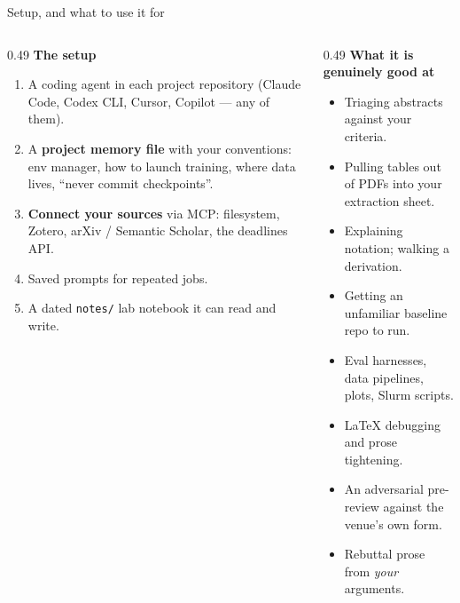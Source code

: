 \documentclass[aspectratio=169,11pt]{beamer}
\newcommand{\code}[1]{\texttt{\small #1}}
\newcommand{\key}[1]{\textbf{\color{brand}#1}}
\begin{document}
\begin{frame}{Setup, and what to use it for}
\begin{columns}[T]
\begin{column}{0.49\textwidth}
\textbf{The setup}
\footnotesize
\begin{enumerate}
  \item A coding agent in each project repository (Claude Code, Codex CLI,
        Cursor, Copilot --- any of them).
  \item A \key{project memory file} with your conventions: env manager, how to
        launch training, where data lives, ``never commit checkpoints''.
  \item \key{Connect your sources} via MCP: filesystem, Zotero, arXiv /
        Semantic Scholar, the deadlines API.
  \item Saved prompts for repeated jobs.
  \item A dated \code{notes/} lab notebook it can read and write.
\end{enumerate}
\end{column}
\begin{column}{0.49\textwidth}
\textbf{What it is genuinely good at}
\footnotesize
\begin{itemize}
  \item Triaging abstracts against your criteria.
  \item Pulling tables out of PDFs into your extraction sheet.
  \item Explaining notation; walking a derivation.
  \item Getting an unfamiliar baseline repo to run.
  \item Eval harnesses, data pipelines, plots, Slurm scripts.
  \item LaTeX debugging and prose tightening.
  \item An adversarial pre-review against the venue's own form.
  \item Rebuttal prose from \emph{your} arguments.
\end{itemize}
\end{column}
\end{columns}
\end{frame}
\end{document}
